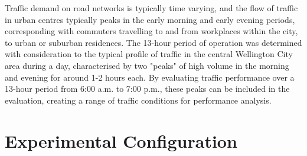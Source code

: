 Traffic demand on road networks is typically time varying, and the flow of traffic in urban centres typically peaks in the early morning and early evening periods, corresponding with commuters travelling to and from workplaces within the city, to urban or suburban residences. The 13-hour period of operation was determined with consideration to the typical profile of traffic in the central Wellington City area during a day, characterised by two "peaks" of high volume in the morning and evening for around 1-2 hours each. By evaluating traffic performance over a 13-hour period from 6:00 a.m. to 7:00 p.m., these peaks can be included in the evaluation, creating a range of traffic conditions for performance analysis. 

\section{Experimental Configuration}

